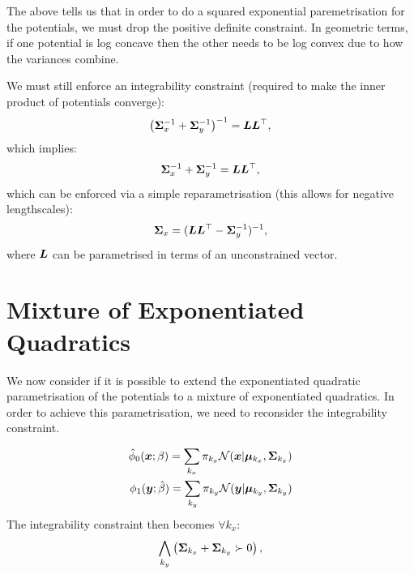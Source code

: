 \documentclass[a4paper,12pt,twoside,openright]{report}
\theoremstyle{definition}
\begin{document}
The above tells us that in order to do a squared exponential paremetrisation for the potentials, we must drop the positive definite constraint. In geometric terms, if one potential is log concave then the other needs to be log convex due to how the variances combine.

We must still enforce an integrability constraint (required to make the inner product of potentials converge):
\begin{align*}
\left({\bm{\Sigma}}_x^{-1} +{\bm{\Sigma}}_y^{-1}\right)^{-1} = {\bm{L}}{\bm{L}}^{\top},
\end{align*}
which implies:
\begin{align*}
{\bm{\Sigma}}_x^{-1} +{\bm{\Sigma}}_y^{-1} = {\bm{L}}{\bm{L}}^{\top},
\end{align*}
which can be enforced via a simple reparametrisation (this allows for negative lengthscales):
\begin{align*}
{\bm{\Sigma}}_x = ({\bm{L}}{\bm{L}}^{\top} -{\bm{\Sigma}}_y^{-1})^{-1},
\end{align*}
where ${\bm{L}}$ can be parametrised in terms of an unconstrained vector.
\section{Mixture of Exponentiated Quadratics}


We now consider if it is possible to extend the exponentiated quadratic  parametrisation of the potentials to a mixture of exponentiated quadratics. In order to achieve this parametrisation, we need to reconsider the integrability constraint.

\begin{align}
{\hat{\phi}}_0( {\bm{x}} ; \beta) =  \sum_{k_x} \pi_{k_x} {\mathcal{N}}({\bm{x}} | {\bm{\mu}}_{k_x}, {\bm{\Sigma}}_{k_x}) \\
\phi_1( {\bm{y}} ; \hat{\beta}) = \sum_{k_y} \pi_{k_y}  {\mathcal{N}}({\bm{y}} | {\bm{\mu}}_{k_y}, {\bm{\Sigma}}_{k_y}) 
\end{align}
The integrability constraint then becomes $\forall k_x$:
\begin{align*}
   \bigwedge_{k_y} \left({\bm{\Sigma}}_{k_x} +{\bm{\Sigma}}_{k_y} \succ 0\right), 
\end{align*}
\end{document}
